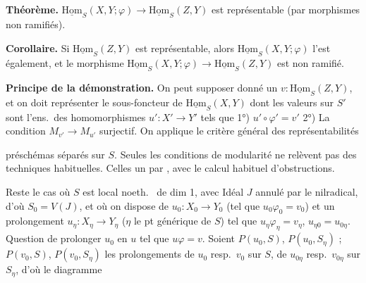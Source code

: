 \documentclass[11pt,a4paper]{article}
\begin{document}
\textbf{Théorème.} $\underline{\mathrm{Hom}}_S(X,Y;\varphi)\to\underline{\mathrm{Hom}}_S(Z,Y)$ est représentable (par morphismes non ramifiés).

\textbf{Corollaire.} Si $\underline{\mathrm{Hom}}_S(Z,Y)$ est représentable, alors $\underline{\mathrm{Hom}}_S(X,Y;\varphi)$ l'est également, et le morphisme $\underline{\mathrm{Hom}}_S(X,Y;\varphi)\to\underline{\mathrm{Hom}}_S(Z,Y)$ est non ramifié.

\textbf{Principe de la démonstration.} On peut supposer donné un $v\colon\underline{\mathrm{Hom}}_S(Z,Y)$, et on doit représenter le sous-foncteur de $\underline{\mathrm{Hom}}_S(X,Y)$ dont les valeurs sur $S'$ sont l'ens.\ des homomorphismes $u'\colon X'\to Y'$ tels que 1°) $u'\circ\varphi'=v'$ 2°) La condition $M_{v'}\to M_{u'}$ surjectif. On applique le critère général des représentabilités  


préschémas \struck{\ill{}}  \struck{\ill{}} séparés sur $S$. Seules les  conditions de modularité ne relèvent pas des techniques habituelles. \struck{\ill{}} Celles \ill{}  un \ill{} par , avec le calcul habituel d'obstructions.

\marginal{\ill{}}

Reste le cas où $S$ est local noeth.\  de dim 1, avec Idéal $J$ annulé par le nilradical, d'où $S_0=V(J)$, et où on dispose de $u_0\colon X_0\to Y_0$ (tel que $u_0\varphi_0=v_0$) et un prolongement $u_\eta\colon X_\eta\to Y_\eta$ ($\eta$ le pt générique de $S$) tel que $u_\eta\varphi_\eta=v_\eta$, $u_{\eta 0}=u_{0\eta}$. Question de prolonger $u_0$ en $u$ tel que $u\varphi=v$. Soient $P(u_0,S)$, $P(u_0,S_\eta)$ ; $P(v_0,S)$, $P(v_0,S_\eta)$ les prolongements de $u_0$ resp.\ $v_0$ sur $S$,  de $u_{0\eta}$ resp.\ $v_{0\eta}$ sur $S_\eta$, d'où le diagramme 

\end{document}
